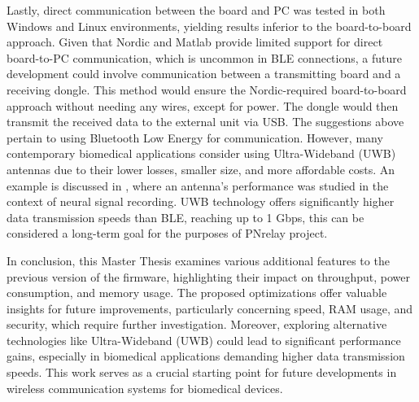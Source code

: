 \documentclass{Configuration_Files/PoliMi3i_thesis}
\begin{document}
Lastly, direct communication between the board and PC was tested in both Windows and Linux environments, yielding results inferior to the board-to-board approach. Given that Nordic and Matlab provide limited support for direct board-to-PC communication, which is uncommon in BLE connections, a future development could involve communication between a transmitting board and a receiving dongle. This method would ensure the Nordic-required board-to-board approach without needing any wires, except for power. The dongle would then transmit the received data to the external unit via USB.
The suggestions above pertain to using Bluetooth Low Energy for communication. However, many contemporary biomedical applications consider using Ultra-Wideband (UWB) antennas due to their lower losses, smaller size, and more affordable costs. An example is discussed in \cite{maneOverviewUltraWideBand2023}, where an antenna's performance was studied in the context of neural signal recording. UWB technology offers significantly higher data transmission speeds than BLE, reaching up to 1 Gbps, this can be considered a long-term goal for the purposes of PNrelay project.

In conclusion, this Master Thesis examines various additional features to the previous version of the firmware, highlighting their impact on throughput, power consumption, and memory usage. The proposed optimizations offer valuable insights for future improvements, particularly concerning speed, RAM usage, and security, which require further investigation. Moreover, exploring alternative technologies like Ultra-Wideband (UWB) could lead to significant performance gains, especially in biomedical applications demanding higher data transmission speeds. This work serves as a crucial starting point for future developments in wireless communication systems for biomedical devices.
\end{document}
